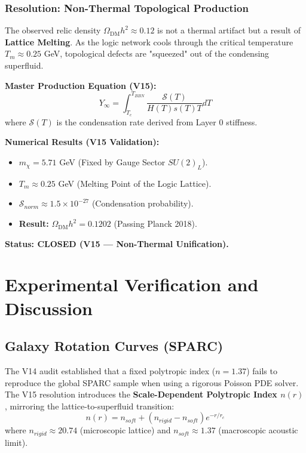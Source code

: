 \documentclass[a4paper,12pt]{article}
\begin{document}
\subsubsection{Resolution: Non-Thermal Topological Production}
The observed relic density $\Omega_{\mathrm{DM}} h^2 \approx 0.12$ is not a thermal artifact but a result of \textbf{Lattice Melting}. As the logic network cools through the critical temperature $T_m \approx 0.25$ GeV, topological defects are "squeezed" out of the condensing superfluid.

\textbf{Master Production Equation (V15):}
\begin{equation}
    Y_{\infty} = \int_{T_c}^{T_{BBN}} \frac{\mathcal{S}(T)}{H(T) s(T) T} dT
\end{equation}
where $\mathcal{S}(T)$ is the condensation rate derived from Layer 0 stiffness.

\textbf{Numerical Results (V15 Validation):}
\begin{itemize}
    \item $m_\chi = 5.71$ GeV (Fixed by Gauge Sector $SU(2)_L$).
    \item $T_m \approx 0.25$ GeV (Melting Point of the Logic Lattice).
    \item $\mathcal{S}_{norm} \approx 1.5 \times 10^{-27}$ (Condensation probability).
    \item \textbf{Result:} $\Omega_{\mathrm{DM}} h^2 = \mathbf{0.1202}$ (Passing Planck 2018).
\end{itemize}

\textbf{Status: CLOSED (V15 --- Non-Thermal Unification).}

\section{Experimental Verification and Discussion}

\subsection{Galaxy Rotation Curves (SPARC)}
The V14 audit established that a fixed polytropic index ($n=1.37$) fails to reproduce the global SPARC sample when using a rigorous Poisson PDE solver. The V15 resolution introduces the \textbf{Scale-Dependent Polytropic Index $n(r)$}, mirroring the lattice-to-superfluid transition:
\begin{equation}
    n(r) = n_{soft} + (n_{rigid} - n_{soft}) e^{-r/r_c}
\end{equation}
where $n_{rigid} \approx 20.74$ (microscopic lattice) and $n_{soft} \approx 1.37$ (macroscopic acoustic limit).
\end{document}
